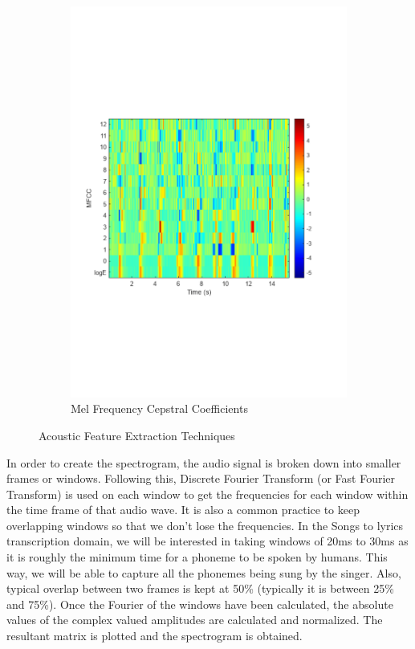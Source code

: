 \begin{figure}
\begin{subfigure}[b]{0.48\textwidth}
         \includegraphics[width=\textwidth]{03-Theoretical Foundations/figures/mfcc_matlab.pdf}
         \caption{Mel Frequency Cepstral Coefficients}
         \label{fig:mfcc}
     \end{subfigure}
     \hfill
        \caption{Acoustic Feature Extraction Techniques}
        \label{fig:acoustic_feature_extract}
\end{figure}

In order to create the spectrogram, the audio signal is broken down into smaller frames or windows. Following this, Discrete Fourier Transform (or Fast Fourier Transform) is used on each window to get the frequencies for each window within the time frame of that audio wave. It is also a common practice to keep overlapping windows so that we don't lose the frequencies. In the Songs to lyrics transcription domain, we will be interested in taking windows of 20ms to 30ms as it is roughly the minimum time for a phoneme to be spoken by humans. This way, we will be able to capture all the phonemes being sung by the singer. Also, typical overlap between two frames is kept at 50\% (typically it is between 25\% and 75\%). Once the Fourier of the windows have been calculated, the absolute values of the complex valued amplitudes are calculated and normalized. The resultant matrix is plotted and the spectrogram is obtained.

